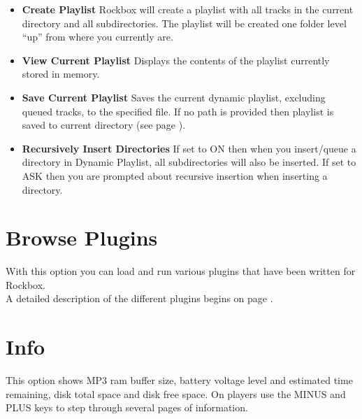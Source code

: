 \begin{itemize}
\item \textbf{Create Playlist}
  Rockbox will create a playlist with all tracks in the current directory and all subdirectories. The playlist will be created one folder level ``up'' from where you currently are.
  
\item \textbf{View Current Playlist}
  Displays the contents of the playlist currently stored in memory.
  
\item \textbf{Save Current Playlist}
  Saves the current dynamic playlist, excluding queued tracks, to the specified file. If no path is provided then playlist is saved to current directory (see page \pageref{ref:Playlistsubmenu}).
  
\item \textbf{Recursively Insert Directories}
  If set to ON then when you insert/queue a directory in Dynamic Playlist, all subdirectories will also be inserted. If set to ASK then you are prompted about recursive insertion when inserting a directory.
\end{itemize}

\section{Browse Plugins}
With this option you can load and run various plugins that have been written for Rockbox.\\

A detailed description of the different plugins begins on page \pageref{ref:Part5}.

\section{\label{ref:Info}Info}
This option shows MP3 ram buffer size, battery voltage level and estimated time remaining, disk total space and disk free space.
On players use the MINUS and PLUS keys to step through several pages of information.

